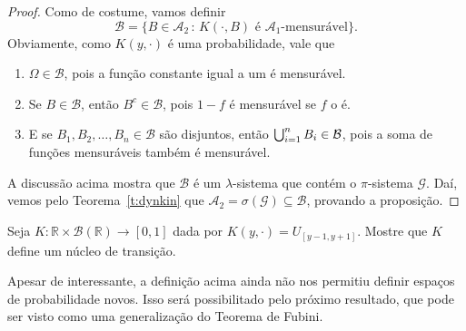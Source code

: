 \begin{proof}
  Como de costume, vamos definir
  \begin{equation}
    \mathcal{B} = \{B \in \mathcal{A}_2\, : \, K(\cdot, B) \text{ é $\mathcal{A}_1$-mensurável}\}.
  \end{equation}
  Obviamente, como $K(y, \cdot)$ é uma probabilidade, vale que
  \begin{enumerate}[\quad a)]
  \item $\Omega \in \mathcal{B}$, pois a função constante igual a um é mensurável.
  \item Se $B \in \mathcal{B}$, então $B^c \in \mathcal{B}$, pois $1 - f$ é mensurável se $f$ o é.
  \item E se $B_1, B_2,\dots, B_n \in \mathcal{B}$ são disjuntos, então $\operatorname*{{\textstyle \bigcup}}_{i=1}^n B_i \in \mathcal{B}$, pois a soma de funções mensuráveis também é mensurável.
  \end{enumerate}

  A discussão acima mostra que $\mathcal{B}$ é um $\lambda$-sistema que contém o $\pi$-sistema $\mathcal{G}$.
  Daí, vemos pelo Teorema~\ref{t:dynkin} que $\mathcal{A}_2 = \sigma(\mathcal{G}) \subseteq \mathcal{B}$, provando a proposição.
\end{proof}

\begin{exercise}
  Seja $K:\mathbb{R} \times \mathcal{B}(\mathbb{R}) \to [0,1]$ dada por $K(y, \cdot) = U_{[y - 1,y + 1]}$.
  Mostre que $K$ define um núcleo de transição.
\end{exercise}

Apesar de interessante, a definição acima ainda não nos permitiu definir espaços de probabilidade novos.
Isso será possibilitado pelo próximo resultado, que pode ser visto como uma generalização do Teorema de Fubini.



